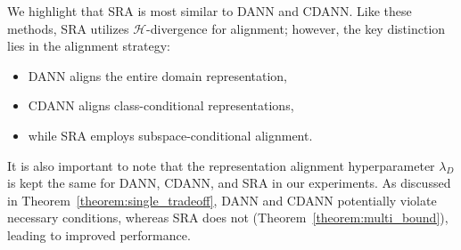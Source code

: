 We highlight that SRA is most similar to DANN and CDANN. Like these methods, SRA utilizes $\mathcal{H}$-divergence for alignment; however, the key distinction lies in the alignment strategy: 
\begin{itemize}
    \item DANN aligns the entire domain representation, 
    \item CDANN aligns class-conditional representations,
    \item while SRA employs subspace-conditional alignment.
\end{itemize}

It is also important to note that the representation alignment hyperparameter $\lambda_D$ is kept the same for DANN, CDANN, and SRA in our experiments. As discussed in Theorem~\ref{theorem:single_tradeoff}, DANN and CDANN potentially violate necessary conditions, whereas SRA does not (Theorem~\ref{theorem:multi_bound}), leading to improved performance.


